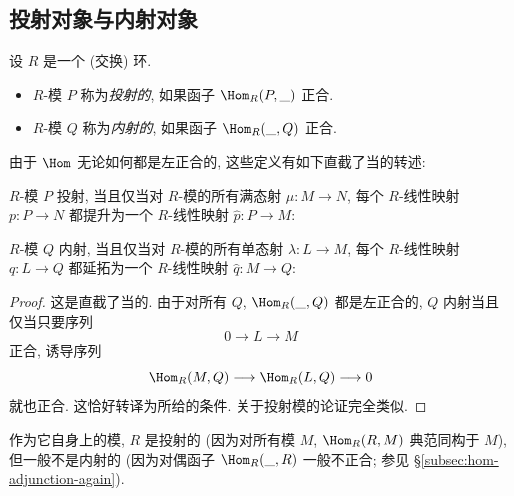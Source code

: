 \subsection{投射对象与内射对象}\label{subsec:projectives-injectives}

\begin{definition}\label{def:projective-injective}
设 $R$ 是一个 (交换) 环.
\begin{itemize}
\item $R$-模 $P$ 称为\emph{投射的}, 如果函子 $\Hom_R(P,\_)$ 正合.
\item $R$-模 $Q$ 称为\emph{内射的}, 如果函子 $\Hom_R(\_,Q)$ 正合.
\end{itemize}
\end{definition}

由于 $\Hom$ 无论如何都是左正合的, 这些定义有如下直截了当的转述:

\begin{lemma}\label{lem:projective-injective-lifting}
$R$-模 $P$ 投射, 当且仅当对 $R$-模的所有满态射 $\mu:M\to N$, 每个 $R$-线性映射 $p:P\to N$ 都提升为一个 $R$-线性映射 $\hat{p}:P\to M$:
\begin{center}
\end{center}
$R$-模 $Q$ 内射, 当且仅当对 $R$-模的所有单态射 $\lambda:L\to M$, 每个 $R$-线性映射 $q:L\to Q$ 都延拓为一个 $R$-线性映射 $\hat{q}:M\to Q$:
\begin{center}
\end{center}
\end{lemma}

\begin{proof}
这是直截了当的. 由于对所有 $Q$, $\Hom_R(\_,Q)$ 都是左正合的, $Q$ 内射当且仅当只要序列
\[
0\longrightarrow L\longrightarrow M
\]
正合, 诱导序列
\[
\Hom_R(M,Q)\longrightarrow\Hom_R(L,Q)\longrightarrow 0
\]
就也正合. 这恰好转译为所给的条件. 关于投射模的论证完全类似.
\end{proof}

\begin{example}\label{ex:R-projective-not-injective}
作为它自身上的模, $R$ 是投射的 (因为对所有模 $M$, $\Hom_R(R,M)$ 典范同构于 $M$), 但一般不是内射的 (因为对偶函子 $\Hom_R(\_,R)$ 一般不正合; 参见 \S\ref{subsec:hom-adjunction-again}).
\end{example}

